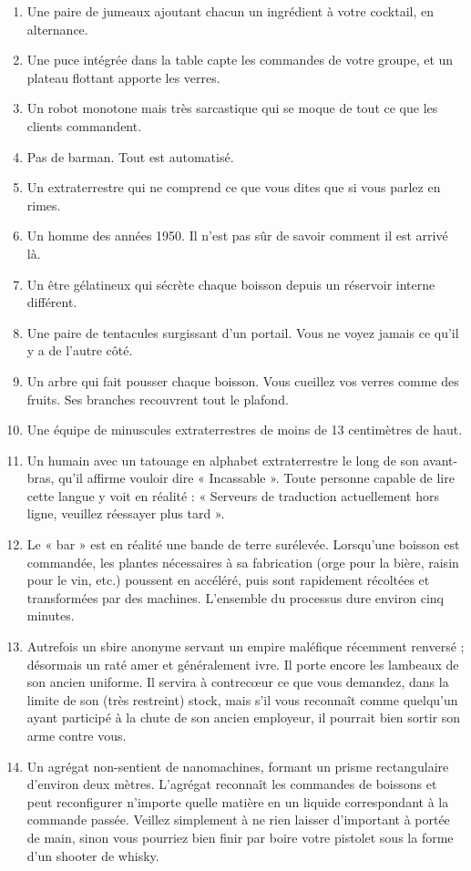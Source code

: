 \documentclass{article}
\begin{document}
\begin{enumerate}
	\item Une paire de jumeaux ajoutant chacun un ingrédient à votre cocktail, en alternance.
	\item Une puce intégrée dans la table capte les commandes de votre groupe, et un plateau flottant apporte les verres.
	\item Un robot monotone mais très sarcastique qui se moque de tout ce que les clients commandent.
	\item Pas de barman. Tout est automatisé.
	\item Un extraterrestre qui ne comprend ce que vous dites que si vous parlez en rimes.
	\item Un homme des années 1950. Il n’est pas sûr de savoir comment il est arrivé là.
	\item Un être gélatineux qui sécrète chaque boisson depuis un réservoir interne différent.
	\item Une paire de tentacules surgissant d’un portail. Vous ne voyez jamais ce qu’il y a de l’autre côté.
	\item Un arbre qui fait pousser chaque boisson. Vous cueillez vos verres comme des fruits. Ses branches recouvrent tout le plafond.
	\item Une équipe de minuscules extraterrestres de moins de 13 centimètres de haut.
	\item Un humain avec un tatouage en alphabet extraterrestre le long de son avant-bras, qu’il affirme vouloir dire « Incassable ». Toute personne capable de lire cette langue y voit en réalité : « Serveurs de traduction actuellement hors ligne, veuillez réessayer plus tard ».
	\item Le « bar » est en réalité une bande de terre surélevée. Lorsqu’une boisson est commandée, les plantes nécessaires à sa fabrication (orge pour la bière, raisin pour le vin, etc.) poussent en accéléré, puis sont rapidement récoltées et transformées par des machines. L’ensemble du processus dure environ cinq minutes.
	\item Autrefois un sbire anonyme servant un empire maléfique récemment renversé ; désormais un raté amer et généralement ivre. Il porte encore les lambeaux de son ancien uniforme. Il servira à contrecœur ce que vous demandez, dans la limite de son (très restreint) stock, mais s’il vous reconnaît comme quelqu’un ayant participé à la chute de son ancien employeur, il pourrait bien sortir son arme contre vous.
	\item Un agrégat non-sentient de nanomachines, formant un prisme rectangulaire d’environ deux mètres. L’agrégat reconnaît les commandes de boissons et peut reconfigurer n’importe quelle matière en un liquide correspondant à la commande passée. Veillez simplement à ne rien laisser d’important à portée de main, sinon vous pourriez bien finir par boire votre pistolet sous la forme d’un shooter de whisky.

\end{enumerate}
\end{document}
